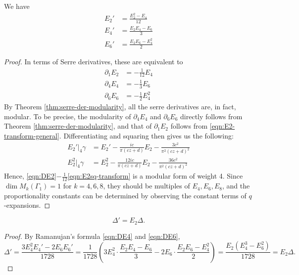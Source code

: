 \begin{theorem}\label{thm:ramanujan-formula}
We have
\begin{align}
    E_2' &= \frac{E_2^2 - E_4}{12} \label{eqn:DE2} \\
    E_4' &= \frac{E_2 E_4 - E_6}{3} \label{eqn:DE4} \\
    E_6' &= \frac{E_2 E_6 - E_4^2}{2} \label{eqn:DE6}
\end{align}
\end{theorem}
\begin{proof}
In terms of Serre derivatives, these are equivalent to
\begin{align}
    \partial_{1}E_2 &= -\frac{1}{12} E_4 \label{eqn:SE2} \\
    \partial_{4}E_4 &= -\frac{1}{3} E_6 \label{eqn:SE4} \\
    \partial_{6}E_6 &= -\frac{1}{2} E_4^2 \label{eqn:SE6}
\end{align}
By Theorem \ref{thm:serre-der-modularity}, all the serre derivatives are, in fact, modular.
To be precise, the modularity of $\partial_{4} E_4$ and $\partial_6 E_6$ directly follows from Theorem \ref{thm:serre-der-modularity}, and that of $\partial_{1}E_2$ follows from \eqref{eqn:E2-transform-general}.
Differentiating and squaring then gives us the following:
\begin{align}
    E_2'|_{4}\gamma &= E_2' - \frac{ic}{\pi(cz + d)} E_2 - \frac{3c^2}{\pi^2 (cz + d)^2} \label{eqn:DE2-transform} \\
    E_2^2|_{4}\gamma &= E_2^2 - \frac{12ic}{\pi(cz + d)} E_2 - \frac{36c^2}{\pi^2 (cz + d)^2} \label{eqn:E2sq-transform}
\end{align}
Hence, \eqref{eqn:DE2}$-\frac{1}{12}$\eqref{eqn:E2sq-transform} is a modular form of weight 4.
Since $\dim M_k(\Gamma_1) = 1$ for $k = 4, 6, 8$, they should be multiples of $E_4, E_6, E_8$, and the proportionality constants can be determined by observing the constant terms of $q$-expansions.
\end{proof}
\begin{corollary}\label{cor:logder-disc-E2}
\begin{equation}\label{eqn:logder-disc-E2}
    \Delta' = E_2 \Delta.
\end{equation}
\end{corollary}
\begin{proof}
By Ramanujan's formula \eqref{eqn:DE4} and \eqref{eqn:DE6},
\begin{equation}
\Delta' = \frac{3 E_4^2 E_4' - 2 E_6 E_6'}{1728} = \frac{1}{1728} \left(3 E_4^2 \cdot \frac{E_2 E_4 - E_6}{3} - 2 E_6 \cdot \frac{E_2 E_6 - E_4^2}{2}\right) = \frac{E_2(E_4^3 - E_6^2)}{1728} = E_2\Delta.
\end{equation}
\end{proof}

